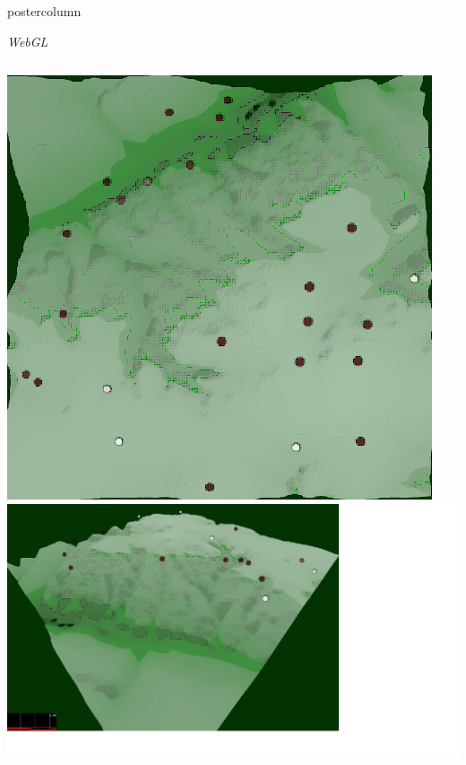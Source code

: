 \documentclass[final,hyperref={pdfpagelabels=false}]{beamer}
\newlength{\columnheight}
\begin{document}
\begin{frame}
\begin{columns}
    \begin{column}{.33\textwidth}
      \begin{beamercolorbox}[center,wd=\textwidth]{postercolumn}
        \begin{minipage}[T]{.95\textwidth} %
          \parbox[t][\columnheight]{\textwidth}{ %

            \vfill
            \begin{block}{\textit{WebGL}}
              \begin{columns}
                \begin{column}{.99\textwidth}
                  \includegraphics[width=0.88\linewidth]{images/fp1}
                  \-
                  \includegraphics[width=0.88\linewidth]{images/fp2}

\end{column}
\end{columns}
\end{block}}
\end{minipage}
\end{beamercolorbox}
\end{column}
\end{columns}
\end{frame}
\end{document}
